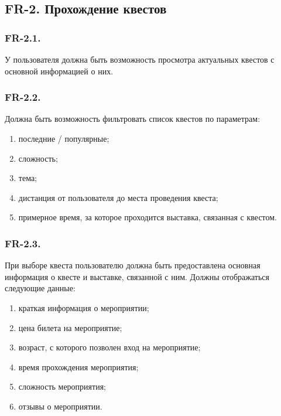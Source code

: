		\subsection*{FR-2. Прохождение квестов}
		
		\subsubsection*{FR-2.1.}

		
		\hspace{10mm}У пользователя должна быть возможность просмотра актуальных квестов с основной информацией о них.
		
		\subsubsection*{FR-2.2.}
		
		
		\hspace{10mm}Должна быть возможность фильтровать список квестов по параметрам:
		
		\begin{enumerate}
			\item последние / популярные;
			\item сложность;		
			\item тема;	
			\item дистанция от пользователя до места проведения квеста;
			\item примерное время, за которое проходится выставка, связанная с квестом.
		\end{enumerate}
	
		\subsubsection*{FR-2.3.}
		
		\hspace{10mm} При выборе квеста пользователю должна быть предоставлена основная информация о квесте и выставке, связанной с ним. Должны отображаться следующие данные:
		\begin{enumerate}
		 	\item краткая информация о мероприятии;
		 	\item цена билета на мероприятие;
		 	\item возраст, с которого позволен вход на мероприятие;
		 	\item время прохождения мероприятия;
		 	\item сложность мероприятия;
		 	\item отзывы о мероприятии.
		\end{enumerate}
	
